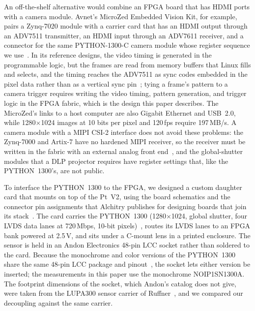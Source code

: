 \documentclass[10pt,journal,compsoc]{IEEEtran}
\newcommand{\SI}[2]{#1\,#2}
\begin{document}
An off-the-shelf alternative would combine an FPGA board that has HDMI ports with a camera module.
Avnet's MicroZed Embedded Vision Kit, for example, pairs a Zynq-7020 module with a carrier card
that has an HDMI output through an ADV7511 transmitter, an HDMI input through an ADV7611 receiver,
and a connector for the same PYTHON-1300-C camera module whose register sequence we
use~\cite{avnet_mzevk,avnet_hdl}. In its reference designs, the video timing is generated in the
programmable logic, but the frames are read from memory buffers that Linux fills and selects, and
the timing reaches the ADV7511 as sync codes embedded in the pixel data rather than as a vertical
sync pin~\cite{avnet_hdl}; tying a frame's pattern to a camera trigger requires writing the video
timing, pattern generation, and trigger logic in the FPGA fabric, which is the design this paper
describes. The MicroZed's links to a host computer are also Gigabit Ethernet and USB~2.0, while
1280$\times$1024 images at 10 bits per pixel and \SI{120}{fps} require \SI{197}{MB/s}. A camera
module with a MIPI CSI-2 interface does not avoid these problems: the Zynq-7000 and Artix-7 have
no hardened MIPI receiver, so the receiver must be written in the fabric with an external analog
front end~\cite{xilinx_xapp894}, and the global-shutter modules that a DLP projector requires
have register settings that, like the PYTHON~1300's, are not public.

To interface the PYTHON~1300 to the FPGA, we designed a custom daughter card that mounts on top
of the Pt~V2, using the board schematics and the connector pin assignments that Alchitry
publishes for designing boards that join its stack~\cite{alchitry_pt_sch,alchitry_labs}. The card
carries the PYTHON~1300 (1280$\times$1024, global shutter, four LVDS data lanes at
\SI{720}{Mbps}, 10-bit pixels)~\cite{onsemi_python1300}, routes its LVDS lanes to an FPGA bank
powered at \SI{2.5}{V}, and sits under a C-mount lens in a printed enclosure. The sensor is held in an Andon Electronics 48-pin LCC socket rather than soldered to the card.
Because the monochrome and color versions of the PYTHON~1300 share the same 48-pin LCC package
and pinout~\cite{onsemi_python1300}, the socket lets either version be inserted; the measurements
in this paper use the monochrome NOIP1SN1300A. The footprint dimensions of the socket, which
Andon's catalog does not give, were taken from the LUPA300 sensor carrier of
Ruffner~\cite{ruffner2018thesis,ruffner_lupa300}, and we compared our decoupling against the
same carrier.
\end{document}
